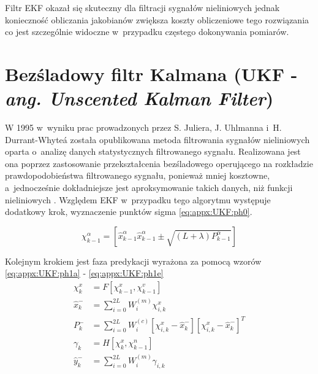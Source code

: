 Filtr EKF okazał się skuteczny dla filtracji sygnałów nieliniowych jednak konieczność obliczania jakobianów zwiększa koszty obliczeniowe tego rozwiązania co jest szczególnie widoczne w~przypadku częstego dokonywania pomiarów. 


\section*{Bezśladowy filtr Kalmana (UKF - \emph{ang. Unscented Kalman Filter})}
\label{sec:appx:filters:UKF}
W 1995 w~wyniku prac prowadzonych przez S. Juliera, J. Uhlmanna i~H. Durrant-Whyte\'a została opublikowana \cite{Julier1995} metoda filtrowania sygnałów nieliniowych oparta o~analizę danych statystycznych filtrowanego sygnału. Realizowana jest ona poprzez zastosowanie przekształcenia bezśladowego operującego na rozkładzie prawdopodobieństwa filtrowanego sygnału, ponieważ mniej kosztowne, a~jednocześnie dokładniejsze jest aproksymowanie takich danych, niż funkcji nieliniowych \cite{Uhlmann94}.
Względem EKF w~przypadku tego algorytmu występuje dodatkowy krok, wyznaczenie punktów sigma \eqref{eq:appx:UKF:ph0}. 

\begin{equation}
	\chi^\alpha_{k-1} = [\widehat{x}^\alpha_{k-1} \widehat{x}^\alpha_{k-1}\pm\sqrt{(L+\lambda)P^\alpha_{k-1}}] \label{eq:appx:UKF:ph0}
\end{equation}

Kolejnym krokiem jest faza predykacji wyrażona za pomocą wzorów \eqref{eq:appx:UKF:ph1a} - \eqref{eq:appx:UKF:ph1e}
\begin{subequations}
	\begin{align}
		\chi^x_{k}        & = F[\chi^x_{k-1},\chi^v_{k-1}] \label{eq:appx:UKF:ph1a}                                                               \\
		\widehat{x}^-_{k} & = \sum_{i=0}^{2L}W_i^{(m)}\chi^x_{i,k}\label{eq:appx:UKF:ph1b}                                                        \\
		P^-_k             & = \sum_{i=0}^{2L}W_i^{(c)}[\chi^x_{i,k}-\widehat{x}^-_{k}][\chi^x_{i,k}-\widehat{x}^-_{k}]^T \label{eq:appx:UKF:ph1c} \\
		\gamma_k          & = H[\chi^x_k, \chi^n_{k-1}] \label{eq:appx:UKF:ph1d}                                                                  \\
		\widehat{y}^-_{k} & = \sum_{i=0}^{2L}W_i^{(m)}\gamma_{i,k} \label{eq:appx:UKF:ph1e}                                                       
	\end{align}
\end{subequations}

